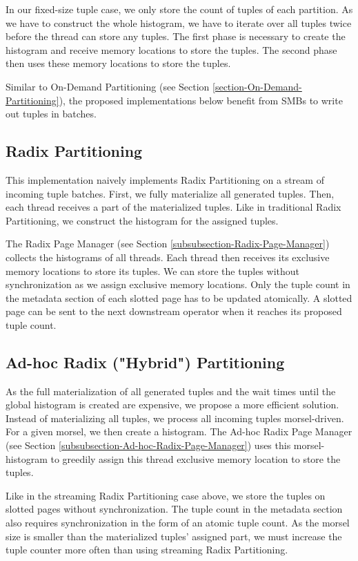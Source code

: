 In our fixed-size tuple case, we only store the count of tuples of each partition.
As we have to construct the whole histogram, we have to iterate over all tuples twice before the thread can store any tuples.
The first phase is necessary to create the histogram and receive memory locations to store the tuples.
The second phase then uses these memory locations to store the tuples.

Similar to On-Demand Partitioning (see Section \ref{section-On-Demand-Partitioning}), the proposed implementations below benefit from \acfp{SMB} to write out tuples in batches.
\subsection{Radix Partitioning}
This implementation naively implements Radix Partitioning on a stream of incoming tuple batches.
First, we fully materialize all generated tuples.
Then, each thread receives a part of the materialized tuples.
Like in traditional Radix Partitioning, we construct the histogram for the assigned tuples.

The Radix Page Manager (see Section \ref{subsubsection-Radix-Page-Manager}) collects the histograms of all threads.
Each thread then receives its exclusive memory locations to store its tuples.
We can store the tuples without synchronization as we assign exclusive memory locations.
Only the tuple count in the metadata section of each slotted page has to be updated atomically.
A slotted page can be sent to the next downstream operator when it reaches its proposed tuple count.

\subsection{Ad-hoc Radix ("Hybrid") Partitioning}
As the full materialization of all generated tuples and the wait times until the global histogram is created are expensive, we propose a more efficient solution.
Instead of materializing all tuples, we process all incoming tuples morsel-driven.
For a given morsel, we then create a histogram.
The Ad-hoc Radix Page Manager (see Section \ref{subsubsection-Ad-hoc-Radix-Page-Manager}) uses this morsel-histogram to greedily assign this thread exclusive memory location to store the tuples.

Like in the streaming Radix Partitioning case above, we store the tuples on slotted pages without synchronization.
The tuple count in the metadata section also requires synchronization in the form of an atomic tuple count.
As the morsel size is smaller than the materialized tuples' assigned part, we must increase the tuple counter more often than using streaming Radix Partitioning.

